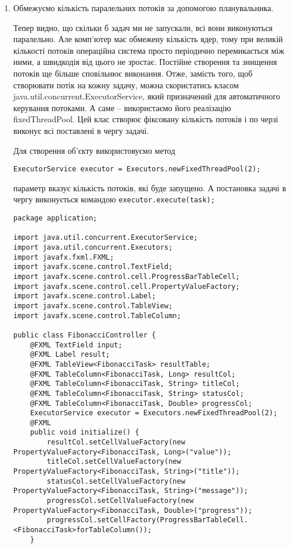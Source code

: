 \begin{enumerate}
	\item Обмежуємо кількість паралельних потоків за допомогою планувальника.

	Тепер видно, що скільки б задач ми не запускали, всі вони виконуються паралельно. Але комп'ютер має обмежену кількість ядер, тому при великій кількості потоків операційна система просто періодично перемикається між ними, а швидкодія від цього не зростає. Постійне створення та знищення потоків ще більше сповільнює виконання. Отже, замість того, щоб створювати потік на кожну задачу, можна скористатись класом java.util.concurrent.ExecutorService, який призначений для автоматичного керування потоками. А саме – використаємо його реалізацію fixedThreadPool. Цей клас створює фіксовану кількість потоків і по черзі виконує всі поставлені в чергу задачі.

	Для створення об'єкту використовуємо метод
\begin{verbatim}
ExecutorService executor = Executors.newFixedThreadPool(2);
\end{verbatim}
	параметр вказує кількість потоків, які буде запущено. А постановка задачі в чергу виконується командою \texttt{executor.execute(task);}

\begin{verbatim}
package application;

import java.util.concurrent.ExecutorService;
import java.util.concurrent.Executors;
import javafx.fxml.FXML;
import javafx.scene.control.TextField;
import javafx.scene.control.cell.ProgressBarTableCell;
import javafx.scene.control.cell.PropertyValueFactory;
import javafx.scene.control.Label;
import javafx.scene.control.TableView;
import javafx.scene.control.TableColumn;

public class FibonacciController {
	@FXML TextField input;
	@FXML Label result;
	@FXML TableView<FibonacciTask> resultTable;
	@FXML TableColumn<FibonacciTask, Long> resultCol;
	@FXML TableColumn<FibonacciTask, String> titleCol;
	@FXML TableColumn<FibonacciTask, String> statusCol;
	@FXML TableColumn<FibonacciTask, Double> progressCol;
	ExecutorService executor = Executors.newFixedThreadPool(2);
	@FXML
	public void initialize() {
		resultCol.setCellValueFactory(new PropertyValueFactory<FibonacciTask, Long>("value"));
		titleCol.setCellValueFactory(new PropertyValueFactory<FibonacciTask, String>("title"));
		statusCol.setCellValueFactory(new PropertyValueFactory<FibonacciTask, String>("message"));
		progressCol.setCellValueFactory(new PropertyValueFactory<FibonacciTask, Double>("progress"));
		progressCol.setCellFactory(ProgressBarTableCell.<FibonacciTask>forTableColumn());
	}


\end{verbatim}
\end{enumerate}
